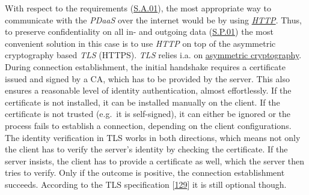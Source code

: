 \documentclass[12pt,english,a4paper,titlepage,cleardoublepage=empty,dottedtoc]{report}
\begin{document}
With respect to the requirements (\protect\hyperlink{sa01}{S.A.01}), the
most appropriate way to communicate with the \emph{PDaaS} over the
internet would be by using \emph{\protect\hyperlink{def--http}{HTTP}}.
Thus, to preserve confidentiality on all in- and outgoing data
(\protect\hyperlink{sp01}{S.P.01}) the most convenient solution in this
case is to use \emph{HTTP} on top of the asymmetric cryptography based
\emph{TLS} (HTTPS). \emph{TLS} relies i.a. on
\protect\hyperlink{def--asym-crypto}{asymmetric cryptography}. During
connection establishment, the initial handshake requires a certificate
issued and signed by a CA, which has to be provided by the server. This
also ensures a reasonable level of identity authentication, almost
effortlessly. If the certificate is not installed, it can be installed
manually on the client. If the certificate is not trusted (e.g.~it is
self-signed), it can either be ignored or the process fails to establish
a connection, depending on the client configurations. The identity
verification in TLS works in both directions, which means not only the
client has to verify the server's identity by checking the certificate.
If the server insists, the client has to provide a certificate as well,
which the server then tries to verify. Only if the outcome is positive,
the connection establishment succeeds. According to the TLS
specification
{[}\protect\hyperlink{ref-web_spec_tls-12_client-auth}{129}{]} it is
still optional though.
\end{document}
